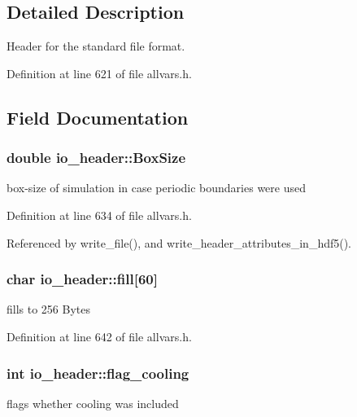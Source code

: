 \subsection{Detailed Description}
Header for the standard file format. 

Definition at line 621 of file allvars.h.



\subsection{Field Documentation}
\hypertarget{structio__header_aacb7ba10d16ae90490a9deba37ace731}{
\subsubsection[{BoxSize}]{\setlength{\rightskip}{0pt plus 5cm}double {\bf io\_\-header::BoxSize}}}
\label{structio__header_aacb7ba10d16ae90490a9deba37ace731}
box-\/size of simulation in case periodic boundaries were used 

Definition at line 634 of file allvars.h.



Referenced by write\_\-file(), and write\_\-header\_\-attributes\_\-in\_\-hdf5().

\hypertarget{structio__header_ac458badfa44878ddc5deb856531a2ee2}{
\subsubsection[{fill}]{\setlength{\rightskip}{0pt plus 5cm}char {\bf io\_\-header::fill}\mbox{[}60\mbox{]}}}
\label{structio__header_ac458badfa44878ddc5deb856531a2ee2}
fills to 256 Bytes 

Definition at line 642 of file allvars.h.

\hypertarget{structio__header_ae877c2fcde2f096886193c22b9b73cbf}{
\subsubsection[{flag\_\-cooling}]{\setlength{\rightskip}{0pt plus 5cm}int {\bf io\_\-header::flag\_\-cooling}}}
\label{structio__header_ae877c2fcde2f096886193c22b9b73cbf}
flags whether cooling was included 

